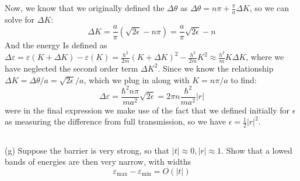 \documentclass[12pt]{article}
\begin{document}
Now, we know that we originally defined the $\Delta \theta$ as $\Delta \theta = n\pi + \frac{\pi}{a}\Delta K$, so we can solve for $\Delta K$:
\begin{equation}
    \Delta K = \frac{a}{\pi}\left(\sqrt{2\epsilon} - n\pi\right) = \frac{a}{\pi}\sqrt{2\epsilon} - n
\end{equation}
And the energy Is defined as $\Delta \varepsilon = \varepsilon\left( K + \Delta K\right) - \varepsilon(K) = \frac{h^2}{2m}\left(K + \Delta K\right)^2 - \frac{h^2}{2m}K^2 \approx  \frac{h^2}{m}K\Delta K$, where we have neglected the second order term $\Delta K^2$. Since we know the relationship $\Delta K = \Delta \theta/a = \sqrt{2\epsilon}/a$, which we plug in along with $K = n\pi/a$ to find:
\begin{equation}
    \Delta \varepsilon = \frac{\hbar^2n\pi}{m a^2}\sqrt{2\epsilon} = 2\pi n \frac{\hbar^2}{m a^2}|r|
\end{equation}
were in the final expression we make use of the fact that we defined initially for $\epsilon$ as measuring the difference from full transmission, so we have $\epsilon = \frac{1}{2} |r|^2$.
\subsection{}
(g) Suppose the barrier is very strong, so that $|t| \approx 0,|r| \approx 1$. Show that a lowed bands of energies are then very narrow, with widths
$$
\varepsilon_{\max }-\varepsilon_{\min }=O(|t|)
$$
\end{document}
